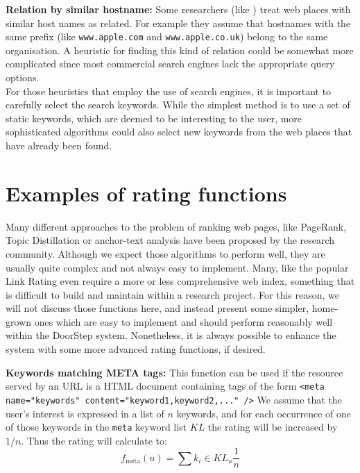 \documentclass[a4paper,twoside]{danarticle}
\theoremstyle{remark}
\begin{document}
    \textbf{Relation by similar hostname:} Some researchers (like 
    \cite[Link Affiliation]{experts}) 
    treat web places with similar host names as related. For example they 
    assume that hostnames with the same prefix (like \verb$www.apple.com$ and
    \verb$www.apple.co.uk$) belong to the same organisation. A heuristic for 
    finding this kind of relation could be somewhat more complicated since most 
    commercial search engines lack the appropriate query options.
    \\
    
    For those heuristics that employ the use of search engines, it is important 
    to carefully select the search keywords. While the simplest method is to use 
    a set of static keywords, which are deemed to be interesting to the user, 
    more sophisticated algorithms could also select new keywords from the web 
    places that have already been found.
  \section{Examples of rating functions}
    \label{rateexample}
    Many different approaches to the problem of ranking web pages, 
    like PageRank\cite{page}, Topic Distillation\cite{kleinberg} or
    anchor-text analysis\cite{chakrabarti} have been proposed by the research
    community. Although we expect those algorithms to perform well, they are
    usually quite complex and not always easy to implement.
    Many, like the popular Link Rating\cite{page}\cite{kleinberg}
    even require a more or less comprehensive web index, something that is difficult 
    to build and maintain within a research project. For this reason, we will not 
    discuss those functions here, and instead present some simpler, home-grown 
    ones which are easy to implement and should perform reasonably well 
    within the DoorStep system. Nonetheless, it is always possible to enhance 
    the system with some more advanced rating functions, if desired.
  
    \textbf{Keywords matching META tags:} This function can be used if the
    resource served by an URL is a HTML document containing tags of the form
    \verb$<meta name="keywords" content="keyword1,keyword2,..." />$ 
    We assume that the user's interest is expressed in a list of $ n $ keywords,
    and for each occurrence of one of those keywords in the \verb$meta$
    keyword list $ KL $ the rating will be increased by $ 1/n $. Thus
    the rating will calculate to:
    \[
      f_{\mbox{meta}}(u) = \sum{k_i \in KL_u} \frac{1}{n}
    \]
    \\
    
\end{document}
